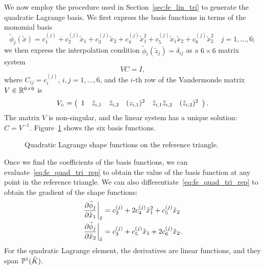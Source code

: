 We now employ the procedure used in Section~\ref{sec:fe_lin_tri} to generate the quadratic Lagrange basis. We first express the basis functions in terms of the monomial basis
\begin{equation}
  \tilde \phi_j(\tilde x) = c_1^{(j)} + c_2^{(j)} \tilde x_1 + c_3^{(j)} \tilde x_2 + c_4^{(j)} \tilde x_1^2 + c_5^{(j)} \tilde x_1 \tilde x_2 + c_6^{(j)} \tilde x_2^2 \quad j = 1,\dots,6;
  \label{eq:fe_quad_tri_rep}
\end{equation}
we then express the interpolation condition $\tilde \phi_i(\tilde z_j) = \delta_{ij}$ as a $6 \times 6$ matrix system
\begin{equation*}
  V C = I,
\end{equation*}
where $C_{ij} = c^{(j)}_i$, $i,j = 1,\dots,6$, and the $i$-th row of the Vandermonde matrix $V \in \RR^{6 \times 6}$ is
\begin{equation*}
  V_{i:} = \bmat{cccccc} 1 & \tilde z_{i,1} & \tilde z_{i,2} &  (z_{i,1})^2 & \tilde z_{i,1} \tilde z_{i,2} & (\tilde z_{i,2})^2 \emat .
\end{equation*}
The matrix $V$ is non-singular, and the linear system has a unique solution: $C = V^{-1}$.  Figure~\ref{fig:fe_shape_tri_p2} shows the six basis functions.

\begin{figure}
  \centering
  \caption{Quadratic Lagrange shape functions on the reference triangle.}
  \label{fig:fe_shape_tri_p2}
\end{figure}

Once we find the coefficients of the basis functions, we can evaluate~\eqref{eq:fe_quad_tri_rep} to obtain the value of the basis function at any point in the reference triangle.  We can also differentiate~\eqref{eq:fe_quad_tri_rep} to obtain the gradient of the shape functions:
\begin{align*}
  \left. \pp{\tilde \phi_j}{\tilde x_1} \right|_{\tilde x} &= c^{(j)}_2 + 2 c^{(j)}_4 \tilde x^2_1 + c^{(j)}_5 \tilde x_2
  \\
  \left. \pp{\tilde \phi_j}{\tilde x_2} \right|_{\tilde x}&= c^{(j)}_3 + c^{(j)}_5 \tilde x_1 + 2 c^{(j)}_6 \tilde x_2.
\end{align*}
For the quadratic Lagrange element, the derivatives are linear functions, and they span $\PP^1(\tilde K)$.

